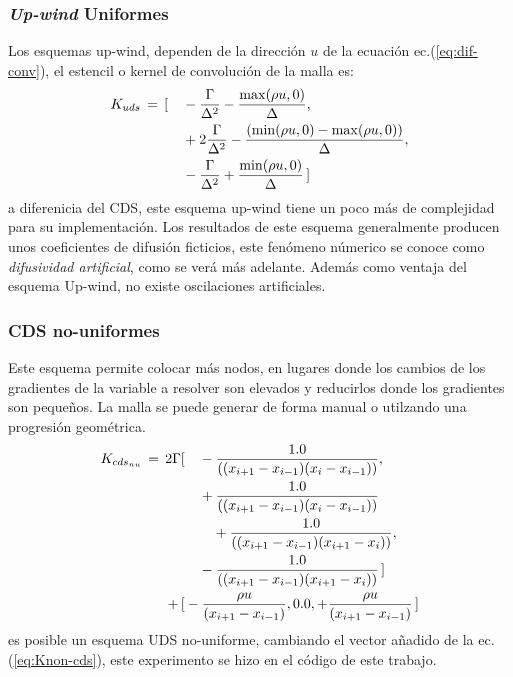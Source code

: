 \documentclass[9pt,technote,twoside,letterpaper,onecolumn]{IEEEtran}
\begin{document}
\begin{multicols}{2}
\subsubsection{\emph{Up-wind} Uniformes}
\label{sec:esq_upwind}
Los esquemas up-wind, dependen de la dirección $u$ de la ecuación ec.(\ref{eq:dif-conv}), el estencil o kernel de convolución de la malla es:
\begin{align}
  K_{uds}\,=\,[&\quad -\frac{\Gamma}{\Delta^2}-\frac{\max(\rho u,0)}{\Delta},\notag\\
  &\quad +2\frac{\Gamma}{\Delta^2}-\frac{(\min(\rho u,0)-\max(\rho u,0))}{\Delta},\label{eq:Kuds}\\
  &\quad -\frac{\Gamma}{\Delta^2}+\frac{\min(\rho u,0)}{\Delta}\,]\notag
\end{align}
a diferenicia del CDS, este esquema up-wind tiene un poco más de complejidad para su implementación. Los resultados de este esquema generalmente producen unos coeficientes de difusión ficticios, este fenómeno númerico se conoce como \emph{difusividad artificial}, como se verá más adelante. Además como ventaja del esquema Up-wind, no existe oscilaciones artificiales.

\subsubsection{CDS no-uniformes}
\label{sec:cds-non-u}
Este esquema permite colocar más nodos, en lugares donde los cambios de los gradientes de la variable a resolver son elevados y reducirlos donde los gradientes son pequeños. La malla se puede generar de forma manual o utilzando una progresión geométrica.
\begin{align}
  K_{cds_{nu}}\,=\,2\Gamma[&\quad -\frac{1.0}{((x_{i+1}-x_{i-1})(x_i-x_{i-1}))}, \notag\\
         &\quad +\frac{1.0}{((x_{i+1}-x_{i-1})(x_i-x_{i-1}))} \notag\\
         &\qquad+ \frac{1.0}{((x_{i+1}-x_{i-1})(x_{i+1}-x_i))}, \label{eq:Knon-cds}\\
         &\quad -\frac{1.0}{((x_{i+1}-x_{i-1})(x_{i+1}-x_i))}\,] \notag\\
  +\,[&-\frac{\rho u}{(x_{i+1}-x_{i-1})}, 0.0, +\frac{\rho u}{(x_{i+1}-x_{i-1})}\,]\notag
\end{align}
es posible un esquema UDS no-uniforme, cambiando el vector añadido de la ec.(\ref{eq:Knon-cds}), este experimento se hizo en el código de este trabajo.


\end{multicols}
\end{document}
